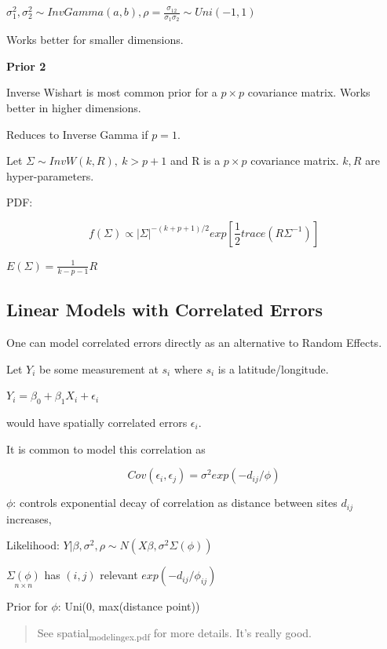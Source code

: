 \documentclass[11pt]{article}
\begin{document}
\begin{enumerate}
\(\sigma_1^2, \sigma_2^2 \sim InvGamma(a, b), \rho = \frac{\sigma_{12}}{\sigma_1 \sigma_2} \sim Uni(-1, 1)\)

Works better for smaller dimensions.

\textbf{Prior 2}

Inverse Wishart is most common prior for a \(p \times p\) covariance matrix. Works
better in higher dimensions.

Reduces to Inverse Gamma if \(p = 1\).

Let \(\Sigma \sim InvW(k, R), \ k > p + 1\) and R is a \(p \times p\) covariance
matrix. \(k, R\) are hyper-parameters.

PDF:

$$
f(\Sigma) \propto  |\Sigma|^{-(k + p + 1)/2} exp \left[ \frac{1}{2} trace(R \Sigma^{-1}) \right]
$$

\(E(\Sigma) = \frac{1}{k - p - 1} R\)
\end{enumerate}

\subsection{Linear Models with Correlated Errors}
\label{sec:orga4e1251}

One can model correlated errors directly as an alternative to Random Effects.

Let \(Y_i\) be some measurement at \(s_i\) where \(s_i\) is a latitude/longitude.

\(Y_i = \beta_0 + \beta_1 X_i + \epsilon_i\)

would have spatially correlated errors \(\epsilon_i\).

It is common to model this correlation as

$$
Cov(\epsilon_i, \epsilon_j) = \sigma^2 exp(-d_{ij}/\phi)
$$

\(\phi\): controls exponential decay of correlation as distance between sites
\(d_{ij}\) increases,

Likelihood: \(Y | \beta, \sigma^2, \rho \sim N(X \beta, \sigma^2 \Sigma (\phi))\)

\(\underset{n \times n}{\Sigma(\phi)}\) has \((i, j)\) relevant \(exp(-d_{ij}/\phi_{ij})\)

Prior for \(\phi\): Uni(0, max(distance point))


\begin{quote}
See spatial\textsubscript{modeling}\textsubscript{ex.pdf} for more details. It's really good.
\end{quote}
\end{document}
